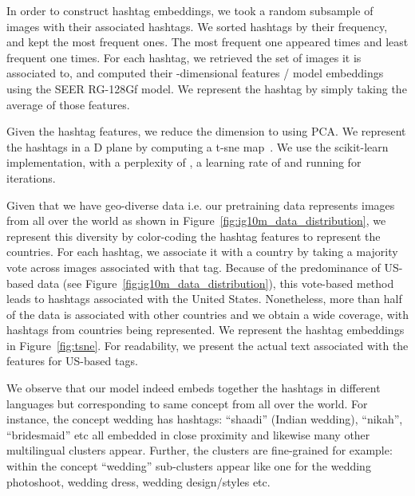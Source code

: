\documentclass[10pt,twocolumn,letterpaper]{article}
\newcommand{\seer}{SEER\xspace}
\begin{document}
In order to construct hashtag embeddings, we took a random subsample of  images with their associated hashtags.
We sorted hashtags by their frequency, and kept the  most frequent ones.
The most frequent one appeared  times and least frequent one  times.
For each hashtag, we retrieved the set of images it is associated to, and computed their -dimensional features / model embeddings using the \seer RG-128Gf model.
We represent the hashtag by simply taking the average of those features.

Given the hashtag features, we reduce the dimension to  using PCA.
We represent the hashtags in a D plane by computing a t-sne map~\cite{van2008visualizing}.
We use the scikit-learn~\cite{scikit-learn} implementation, with a perplexity of , a learning rate of  and running for  iterations.

Given that we have geo-diverse data i.e. our pretraining data represents images from all over the world as shown in Figure~\ref{fig:ig10m_data_distribution}, we represent this diversity by color-coding the hashtag features to represent the countries.
For each hashtag, we associate it with a country by taking a majority vote across images associated with that tag.
Because of the predominance of US-based data (see Figure~\ref{fig:ig10m_data_distribution}), this vote-based method leads to  hashtags associated with the United States.
Nonetheless, more than half of the data is associated with other countries and we obtain a wide coverage, with hashtags from  countries being represented.
We represent the hashtag embeddings in Figure~\ref{fig:tsne}.
For readability, we present the actual text associated with the features for  US-based tags.

We observe that our model indeed embeds together the hashtags in different languages but corresponding to same concept from all over the world. For instance, the concept wedding has hashtags: ``shaadi'' (Indian wedding), ``nikah'', ``bridesmaid'' etc all embedded in close proximity and likewise many other multilingual clusters appear. Further, the clusters are fine-grained for example: within the concept ``wedding'' sub-clusters appear like one for the wedding photoshoot, wedding dress, wedding design/styles etc.
\end{document}
